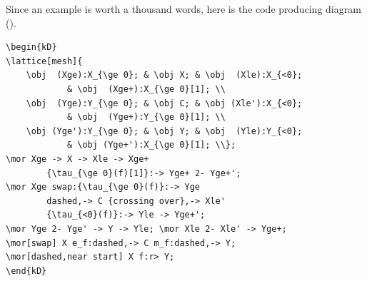 Since an example is worth a thousand words, here is the code producing diagram ().
\begin{center}
\end{center}
\begin{lstlisting}
\begin{kD}
\lattice[mesh]{
	\obj  (Xge):X_{\ge 0}; & \obj X; & \obj  (Xle):X_{<0};
			& \obj  (Xge+):X_{\ge 0}[1]; \\
	\obj  (Yge):Y_{\ge 0}; & \obj C; & \obj (Xle'):X_{<0};
			& \obj  (Yge+):Y_{\ge 0}[1]; \\
	\obj (Yge'):Y_{\ge 0}; & \obj Y; & \obj  (Yle):Y_{<0};
			& \obj (Yge+'):X_{\ge 0}[1]; \\};
\mor Xge -> X -> Xle -> Xge+
		{\tau_{\ge 0}(f)[1]}:-> Yge+ 2- Yge+';
\mor Xge swap:{\tau_{\ge 0}(f)}:-> Yge
		dashed,-> C {crossing over},-> Xle'
		{\tau_{<0}(f)}:-> Yle -> Yge+';
\mor Yge 2- Yge' -> Y -> Yle; \mor Xle 2- Xle' -> Yge+;
\mor[swap] X e_f:dashed,-> C m_f:dashed,-> Y;
\mor[dashed,near start] X f:r> Y;
\end{kD}
\end{lstlisting}